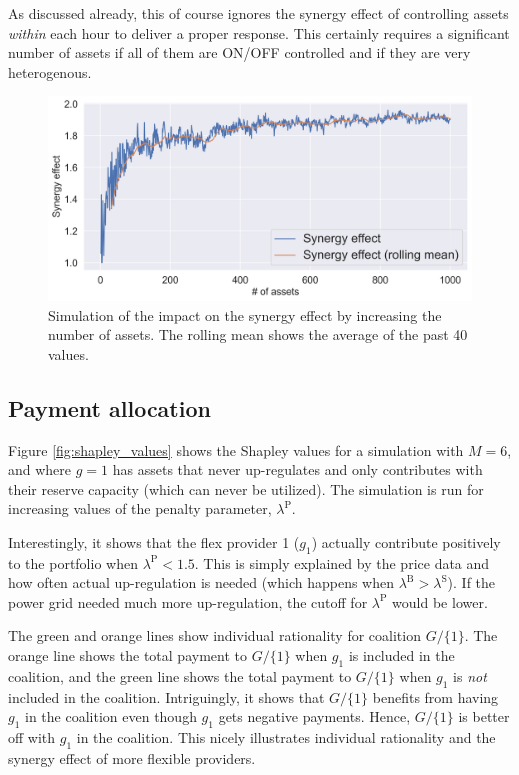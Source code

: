\documentclass[lettersize,journal]{IEEEtran}
\begin{document}
As discussed already, this of course ignores the synergy effect of controlling assets \textit{within} each hour to deliver a proper response. This certainly requires a significant number of assets if all of them are ON/OFF controlled and if they are very heterogenous.

\begin{figure}[!t]
    \centering
    \includegraphics[width=\columnwidth]{figures/synergy_effect.png}
    \caption{Simulation of the impact on the synergy effect by increasing the number of assets. The rolling mean shows the average of the past 40 values.}
    \label{fig:synergy_effect}
\end{figure}

\subsection{Payment allocation}

Figure \ref{fig:shapley_values} shows the Shapley values for a simulation with $M = 6$, and where $g = 1$ has assets that never up-regulates and only contributes with their reserve capacity (which can never be utilized). The simulation is run for increasing values of the penalty parameter, $\lambda^{\text{P}}$.

Interestingly, it shows that the flex provider 1 ($g_1$) actually contribute positively to the portfolio when $\lambda^{\text{P}} < 1.5$. This is simply explained by the price data and how often actual up-regulation is needed (which happens when $\lambda^{\text{B}} > \lambda^{\text{S}}$). If the power grid needed much more up-regulation, the cutoff for $\lambda^{\text{P}}$ would be lower.

The green and orange lines show individual rationality for coalition $G / \{1\}$. The orange line shows the total payment to $G / \{1\}$ when $g_1$ is included in the coalition, and the green line shows the total payment to $G / \{1\}$ when $g_1$ is \textit{not} included in the coalition. Intriguingly, it shows that $G / \{1\}$ benefits from having $g_1$ in the coalition even though $g_1$ gets negative payments. Hence, $G / \{1\}$ is better off with $g_1$ in the coalition. This nicely illustrates individual rationality and the synergy effect of more flexible providers.
\end{document}
